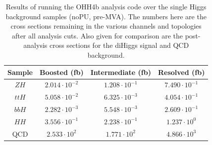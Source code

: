 \documentclass[11pt]{article}
\begin{document}
\begin{table}[htp]
\begin{center}
\begin{tabular}{|c|c|c|c|}
\hline
Sample & Boosted (fb) & Intermediate (fb) & Resolved (fb) \\
\hline\hline
$ZH$ & $2.014\cdot 10^{-2}$ & $1.208\cdot 10^{-1}$ & $7.490\cdot 10^{-1}$ \\
$ttH$ & $5.058\cdot 10^{-2}$ & $6.325\cdot 10^{-3}$ & $4.054\cdot 10^{-1}$ \\
$bbH$ & $2.282\cdot 10^{-3}$ & $5.548\cdot 10^{-3}$ & $2.609\cdot 10^{-1}$\\
\hline\hline
$HH$ & $3.556\cdot 10^{-1}$  & $2.238\cdot 10^{-1}$ &  $1.237\cdot 10^{0}$ \\
QCD &  $2.533\cdot 10^{2}$ & $1.771\cdot 10^{2}$ & $4.866\cdot 10^{3}$ \\
\hline
\end{tabular}
\end{center}
\label{HBF}
\caption{ Results of running the OHH4b analysis code over the single Higgs background samples (noPU, pre-MVA). The numbers here are the cross sections remaining in the various channels and topologies after all analysis cuts. Also given for comparison are the post-analysis cross sections for the diHiggs signal and QCD background.}
\end{table}%
\end{document}
